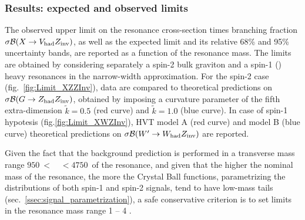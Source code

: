\clearpage

\subsubsection{Results: expected and observed limits}


The observed upper limit on the resonance cross-section times branching fraction $\sigma \mathcal{B} (X \rightarrow V_{\text{had}} Z_{\text{inv}})$, as well as the expected limit and its relative 68\% and 95\% uncertainty bands, are reported as a function of the resonance mass. The limits are obtained by considering separately a spin-2 bulk graviton and a spin-1 (\Wp) heavy resonances in the narrow-width approximation. For the spin-2 case (fig.~\ref{fig:Limit_XZZInv}), data are compared to theoretical predictions on $\sigma \mathcal{B} (G \rightarrow Z_{\text{had}} Z_{\text{inv}})$, obtained by imposing a curvature parameter of the fifth extra-dimension $\tilde{k} = 0.5$ (red curve) and $\tilde{k} = 1.0$ (blue curve). In case of spin-1 hypotesis (fig.\ref{fig:Limit_XWZInv}), HVT model A (red curve) and model B (blue curve) theoretical predictions on $\sigma \mathcal{B} (W' \rightarrow W_{\text{had}} Z_{\text{inv}})$ are reported.

\noindent Given the fact that the background prediction is performed in a transverse mass range $950~<$~\mtVZ~$<4750$~\GeV of the resonance, and given that the higher the nominal mass of the resonance, the more the Crystal Ball functions, parametrizing the \mtVZ distributions of both spin-1 and spin-2 signals, tend to have low-mass tails (sec.~\ref{ssec:signal_parametrization}), a safe conservative criterion is to set limits in the resonance mass range 1 \TeV -- 4 \TeV.

